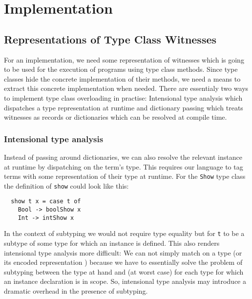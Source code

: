 \chapter{Implementation}
\label{ch:implementation}

\section{Representations of Type Class Witnesses} %
\label{sec:representations}

For an implementation, we need some representation of witnesses which is going to be used for the execution of programs using type class methods.
Since type classes hide the concrete implementation of their methods, we need a means to extract this concrete implementation when needed.
There are essentialy two ways to implement type class overloading in practise: Intensional type analysis which dispatches a type representation at runtime and dictionary passing which treats witnesses as records or dictionaries which can be resolved at compile time.

\subsection{Intensional type analysis}
\label{sec:intensional-analysis}

Instead of passing around dictionaries, we can also resolve the relevant instance at runtime by dispatching on the term's type.
This requires our language to tag terms with some representation of their type at runtime.
For the \texttt{Show} type class the definition of \texttt{show} could look like this:

\begin{verbatim}
  show t x = case t of
    Bool -> boolShow x
    Int -> intShow x
\end{verbatim}

In the context of subtyping we would not require type equality but for \texttt{t} to be a subtype of some type for which an instance is defined.
This also renders intensional type analysis more difficult:
We can not simply match on a type (or its encoded representation \cite{weirich2000}) because we have to essentially solve the problem of subtyping between the type at hand and (at worst case) for each type for which an instance declaration is in scope.
So, intensional type analysis may introduce a dramatic overhead in the presence of subtyping.


